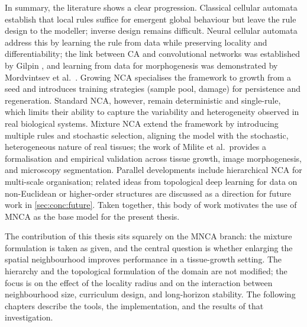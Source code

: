 In summary, the literature shows a clear progression. Classical cellular automata establish that local rules suffice for emergent global behaviour but leave the rule design to the modeller; inverse design remains difficult. Neural cellular automata address this by learning the rule from data while preserving locality and differentiability; the link between CA and convolutional networks was established by Gilpin \cite{ca_gilpin2019}, and learning from data for morphogenesis was demonstrated by Mordvintsev et al.\ \cite{nca_mordvintsev2020}. Growing NCA specialises the framework to growth from a seed and introduces training strategies (sample pool, damage) for persistence and regeneration. Standard NCA, however, remain deterministic and single-rule, which limits their ability to capture the variability and heterogeneity observed in real biological systems. Mixture NCA extend the framework by introducing multiple rules and stochastic selection, aligning the model with the stochastic, heterogeneous nature of real tissues; the work of Milite et al.\ provides a formalisation and empirical validation across tissue growth, image morphogenesis, and microscopy segmentation. Parallel developments include hierarchical NCA for multi-scale organisation; related ideas from topological deep learning for data on non-Euclidean or higher-order structures are discussed as a direction for future work in \cref{sec:conc:future}. Taken together, this body of work motivates the use of MNCA as the base model for the present thesis.

The contribution of this thesis sits squarely on the MNCA branch: the mixture formulation is taken as given, and the central question is whether enlarging the spatial neighbourhood improves performance in a tissue-growth setting. The hierarchy and the topological formulation of the domain are not modified; the focus is on the effect of the locality radius and on the interaction between neighbourhood size, curriculum design, and long-horizon stability. The following chapters describe the tools, the implementation, and the results of that investigation.
